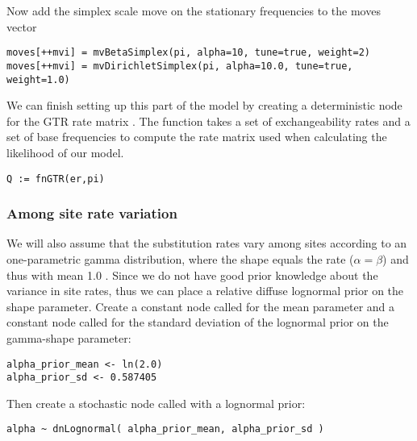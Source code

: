Now add the simplex scale move on the stationary frequencies to the moves vector

{\tt \small \begin{snugshade*}
\begin{lstlisting}
moves[++mvi] = mvBetaSimplex(pi, alpha=10, tune=true, weight=2) 
moves[++mvi] = mvDirichletSimplex(pi, alpha=10.0, tune=true, weight=1.0)
\end{lstlisting}
\end{snugshade*}}

We can finish setting up this part of the model by creating a deterministic node for the GTR rate matrix . 
The  function takes a set of exchangeability rates and a set of base frequencies to compute the rate matrix used when calculating the likelihood of our model.
{\tt \begin{snugshade*}
\begin{lstlisting}
Q := fnGTR(er,pi)
\end{lstlisting}
\end{snugshade*}}


\subsubsection{Among site rate variation}

We will also assume that the substitution rates vary among sites according to an one-parametric gamma distribution, \IE where the shape equals the rate ($\alpha=\beta$) and thus with mean 1.0 \citep{Yang1994a}. 
Since we do not have good prior knowledge about the variance in site rates, thus we can place a relative diffuse lognormal prior on the shape parameter.
Create a constant node called  for the mean parameter and a constant node called  for the standard deviation of the lognormal prior on the gamma-shape parameter:
{\tt\begin{snugshade*}
\begin{lstlisting}
alpha_prior_mean <- ln(2.0)
alpha_prior_sd <- 0.587405
\end{lstlisting}
\end{snugshade*}}

Then create a stochastic node called  with a lognormal prior:
{\tt\begin{snugshade*}
\begin{lstlisting}
alpha ~ dnLognormal( alpha_prior_mean, alpha_prior_sd )
\end{lstlisting}
\end{snugshade*}}

